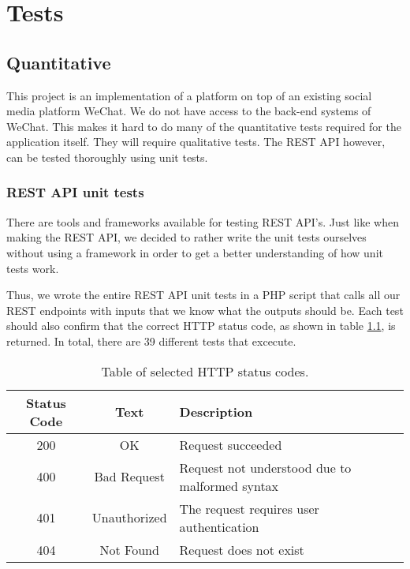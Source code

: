 
\chapter{Tests}
\label{chp:Tests}


\section{Quantitative}

This project is an implementation of a platform on top of an existing social media platform WeChat. We do not have access to the back-end systems of WeChat. This makes it hard to do many of the quantitative tests required for the application itself. They will require qualitative tests. The REST API however, can be tested thoroughly using unit tests. 

\subsection{REST API unit tests}

There are tools and frameworks available for testing REST API's. Just like when making the REST API, we decided to rather write the unit tests ourselves without using a framework in order to get a better understanding of how unit tests work.

Thus, we wrote the entire REST API unit tests in a PHP script that calls all our REST endpoints with inputs that we know what the outputs should be. Each test should also confirm that the correct HTTP status code, as shown in table \ref{tbl:http_status_codes},  is returned. In total, there are 39 different tests that excecute. 

\begin{table}
	\begin{center}
		\caption{Table of selected HTTP status codes.} 
		\begin{tabular}	{ | c | c | p{5cm}|}
		\hline
		\textbf{Status Code} & \textbf{Text} & \textbf{Description} \\ \hline
		200 & OK & Request succeeded \\ \hline
		400 & Bad Request & Request not understood due to malformed syntax \\ \hline
		401 & Unauthorized & The request requires user authentication \\ \hline
		404 & Not Found & Request does not exist \\ \hline
		
		\end{tabular}
		
		\label{tbl:http_status_codes}
	\end{center}
\end{table}



